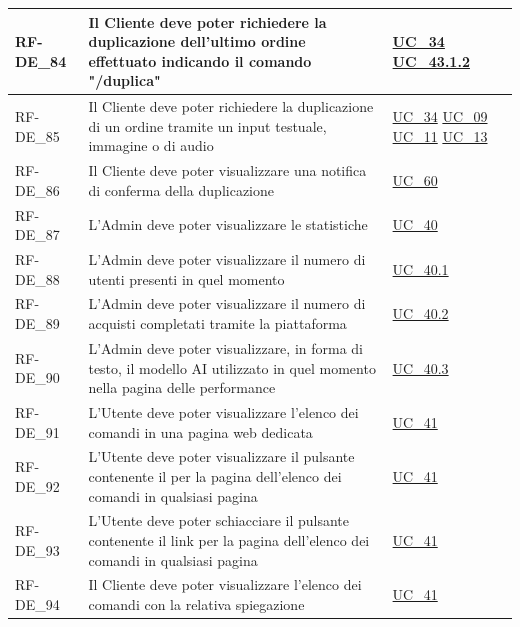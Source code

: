 \begin{longtable}{|>{\raggedright}p{}|>{\raggedright\arraybackslash}p{}|>{\raggedright\arraybackslash}p{}|}
	\hline
	RF-DE\_84 \hypertarget{rf-de_84} & Il Cliente deve poter richiedere la duplicazione dell'ultimo ordine effettuato indicando il comando "/duplica" & \hyperref[uc_34]{UC\_34} \newline \hyperref[uc_43.1.2]{UC\_43.1.2} \\
	\hline
	RF-DE\_85 \hypertarget{rf-de_85} & Il Cliente deve poter richiedere la duplicazione di un ordine tramite un input testuale, immagine o di audio & \hyperref[uc_34]{UC\_34} \newline \hyperref[uc_09]{UC\_09} \newline \hyperref[uc_11]{UC\_11} \newline \hyperref[uc_13]{UC\_13} \\
	\hline
	RF-DE\_86 \hypertarget{rf-de_86} & Il Cliente deve poter visualizzare una notifica di conferma della duplicazione & \hyperref[uc_60]{UC\_60} \\
	\hline
	RF-DE\_87 \hypertarget{rf-de_87} & L'Admin deve poter visualizzare le statistiche & \hyperref[uc_40]{UC\_40} \\
	\hline
	RF-DE\_88 \hypertarget{rf-de_88} & L'Admin deve poter visualizzare il numero di utenti presenti in quel momento & \hyperref[uc_40.1]{UC\_40.1} \\
	\hline
	RF-DE\_89 \hypertarget{rf-de_89} & L'Admin deve poter visualizzare il numero di acquisti completati tramite la piattaforma & \hyperref[uc_40.2]{UC\_40.2} \\
	\hline
	RF-DE\_90 \hypertarget{rf-de_90} & L'Admin deve poter visualizzare, in forma di testo, il modello AI utilizzato in quel momento nella pagina delle performance & \hyperref[uc_40.3]{UC\_40.3} \\
	\hline
	RF-DE\_91 \hypertarget{rf-de_91} & L'Utente deve poter visualizzare l'elenco dei comandi in una pagina web dedicata & \hyperref[uc_41]{UC\_41} \\
	\hline
	RF-DE\_92 \hypertarget{rf-de_92} & L'Utente deve poter visualizzare il pulsante contenente il per la pagina dell'elenco dei comandi in qualsiasi pagina & \hyperref[uc_41]{UC\_41} \\
	\hline
	RF-DE\_93 \hypertarget{rf-de_93} & L'Utente deve poter schiacciare il pulsante contenente il link per la pagina dell'elenco dei comandi in qualsiasi pagina & \hyperref[uc_41]{UC\_41} \\
	\hline
	RF-DE\_94 \hypertarget{rf-de_94} & Il Cliente deve poter visualizzare l'elenco dei comandi con la relativa spiegazione & \hyperref[uc_41]{UC\_41} \\

\end{longtable}
